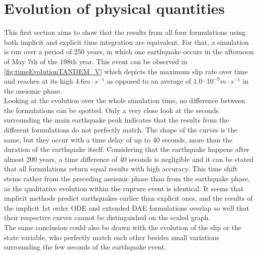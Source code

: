 \section{Evolution of physical quantities}
\label{sec:Results_EvolutionSlipRate}
This first section aims to show that the results from all four formulations using both implicit and explicit time integration are equivalent. For that, a simulation is run over a period of 250 years, in which one earthquake occurs in the afternoon of May 7th of the 198th year. This event can be observed in \autoref{fig:timeEvolutionTANDEM_V} which depicts the maximum slip rate over time and reaches at its high $4.6m\cdot s^{-1}$ as opposed to an average of $1.0 \cdot 10^{-9}m\cdot s^{-1}$ in the aseismic phase.  \\
Looking at the evolution over the whole simulation time, no difference between the formulations can be spotted. Only a very close look at the seconds surrounding the main earthquake peak indicates that the results from the different formulations do not perfectly match. The shape of the curves is the same, but they occur with a time delay of up to 40 seconds, more than the duration of the earthquake itself. Considering that the earthquake happens after almost 200 years, a time difference of 40 seconds is negligible and it can be stated that all formulations return equal results with high accuracy. This time shift stems rather from the preceding aseismic phase than from the earthquake phase, as the qualitative evolution within the rupture event is identical. It seems that implicit methods predict earthquakes earlier than explicit ones, and the results of the implicit 1st order ODE and extended DAE formulations overlap so well that their respective curves cannot be distinguished on the scaled graph.  \\
The same conclusion could also be drawn with the evolution of the slip or the state variable, who perfectly match each other besides small variations surrounding the few seconds of the earthquake event. 


